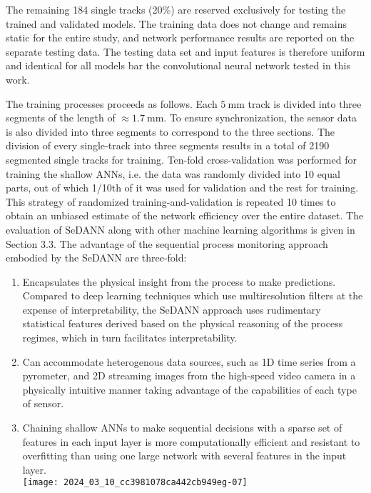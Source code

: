 \documentclass[10pt]{article}
\begin{document}
The remaining 184 single tracks (20\%) are reserved exclusively for testing the trained and validated models. The training data does not change and remains static for the entire study, and network performance results are reported on the separate testing data. The testing data set and input features is therefore uniform and identical for all models bar the convolutional neural network tested in this work.

The training processes proceeds as follows. Each $5 \mathrm{~mm}$ track is divided into three segments of the length of $\approx 1.7 \mathrm{~mm}$. To ensure synchronization, the sensor data is also divided into three segments to correspond to the three sections. The division of every single-track into three segments results in a total of 2190 segmented single tracks for training. Ten-fold cross-validation was performed for training the shallow ANNs, i.e. the data was randomly divided into 10 equal parts, out of which 1/10th of it was used for validation and the rest for training. This strategy of randomized training-and-validation is repeated 10 times to obtain an unbiased estimate of the network efficiency over the entire dataset. The evaluation of SeDANN along with other machine learning algorithms is given in Section 3.3. The advantage of the sequential process monitoring approach embodied by the SeDANN are three-fold:

\begin{enumerate}
  \item Encapsulates the physical insight from the process to make predictions. Compared to deep learning techniques which use multiresolution filters at the expense of interpretability, the SeDANN approach uses rudimentary statistical features derived based on the physical reasoning of the process regimes, which in turn facilitates interpretability.

  \item Can accommodate heterogenous data sources, such as 1D time series from a pyrometer, and 2D streaming images from the high-speed video camera in a physically intuitive manner taking advantage of the capabilities of each type of sensor.

  \item Chaining shallow ANNs to make sequential decisions with a sparse set of features in each input layer is more computationally efficient and resistant to overfitting than using one large network with several features in the input layer.\\
\texttt{[image: 2024\_03\_10\_cc3981078ca442cb949eg-07]}

\end{enumerate}
\end{document}
